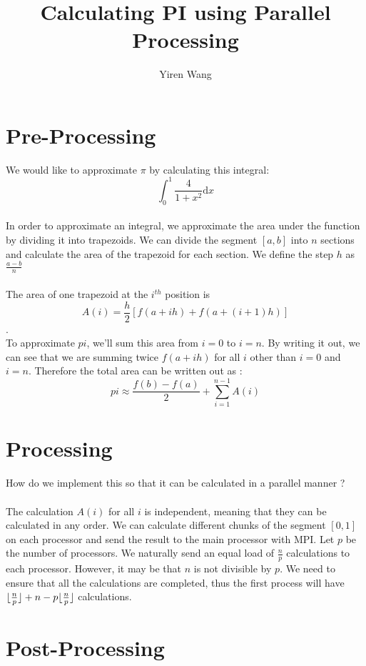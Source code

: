 \documentclass[a4paper]{article}
\title{Calculating PI using Parallel Processing}
\author{Yiren Wang}
\DeclarePairedDelimiter\floor{\lfloor}{\rfloor}
\begin{document}
\maketitle

\newpage
\section{Pre-Processing}
We would like to approximate $\pi$ by calculating this integral: $$\int_0^1 \frac{4}{1 + x^2} \mathrm{d}x$$
\\
In order to approximate an integral, we approximate the area under the function by dividing it into trapezoids. We can divide the segment $[a,b]$ into $n$ sections and calculate the area of the trapezoid for each section. We define the step $h$ as $\frac{a-b}{n}$
\\\\
The area of one trapezoid at the $i^{th}$ position is $$A(i) = \frac{h}{2}[f(a + ih) + f(a + (i+1)h)]$$. 
\\
To approximate $pi$, we'll sum this area from $i=0$ to $i=n$. By writing it out, we can see that we are summing twice $f(a + ih)$ for all $i$ other than $i=0$ and $i=n$. Therefore the total area can be written out as : 
$$ pi \approx \frac{f(b) - f(a)}{2} + \sum_{i=1}^{n-1}A(i)  $$

\section{Processing}
\smallskip
How do we implement this so that it can be calculated in a parallel manner ? 
\\\\
The calculation $A(i)$ for all $i$ is independent, meaning that they can be calculated in any order. We can calculate different chunks of the segment $[0,1]$ on each processor and send the result to the main processor with MPI. Let $p$ be the number of processors. We naturally send an equal load of $\frac{n}{p}$ calculations to each processor. However, it may be that $n$ is not divisible by $p$. We need to ensure that all the calculations are completed, thus the first process will have $\floor{\frac{n}{p}} + n - p\floor{\frac{n}{p}}$ calculations. 

\newpage
\section{Post-Processing}
\end{document}

